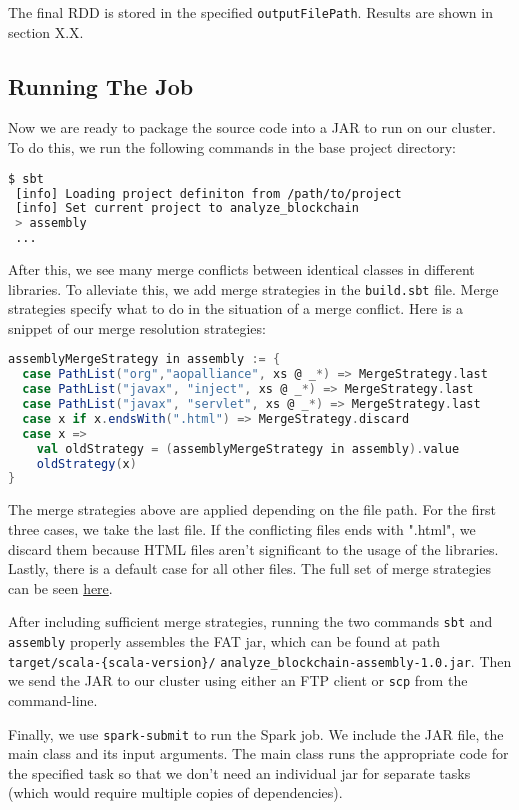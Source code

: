 \documentclass[9pt,twocolumn,twoside]{idsi}
\begin{document}
The final RDD is stored in the specified \lstinline{outputFilePath}. Results are shown in section X.X.

\subsection{Running The Job}
Now we are ready to package the source code into a JAR to run on our cluster. To do this, we run the following commands in the base project directory:

\begin{lstlisting}[language=bash]
 $ sbt
 [info] Loading project definiton from /path/to/project
 [info] Set current project to analyze_blockchain
 > assembly
 ...
\end{lstlisting}

After this, we see many merge conflicts between identical classes in different libraries. To alleviate this, we add merge strategies in the \lstinline{build.sbt} file. Merge strategies specify what to do in the situation of a merge conflict. Here is a snippet of our merge resolution strategies:

\begin{lstlisting}[language=Scala]
assemblyMergeStrategy in assembly := {
  case PathList("org","aopalliance", xs @ _*) => MergeStrategy.last
  case PathList("javax", "inject", xs @ _*) => MergeStrategy.last
  case PathList("javax", "servlet", xs @ _*) => MergeStrategy.last
  case x if x.endsWith(".html") => MergeStrategy.discard
  case x =>
    val oldStrategy = (assemblyMergeStrategy in assembly).value
    oldStrategy(x)
}
\end{lstlisting}

The merge strategies above are applied depending on the file path. For the first three cases, we take the last file. If the conflicting files ends with ".html", we discard them because HTML files aren't significant to the usage of the libraries. Lastly, there is a default case for all other files. The full set of merge strategies can be seen \href{https://google.com}{here}.

After including sufficient merge strategies, running the two commands \lstinline{sbt} and \lstinline{assembly} properly assembles the FAT jar, which can be found at path \lstinline|target/scala-{scala-version}/| \lstinline|analyze_blockchain-assembly-1.0.jar|. Then we send the JAR to our cluster using either an FTP client or \lstinline{scp} from the command-line.

Finally, we use \lstinline{spark-submit} to run the Spark job. We include the JAR file, the main class and its input arguments. The main class runs the appropriate code for the specified task so that we don't need an individual jar for separate tasks (which would require multiple copies of dependencies).
\end{document}
